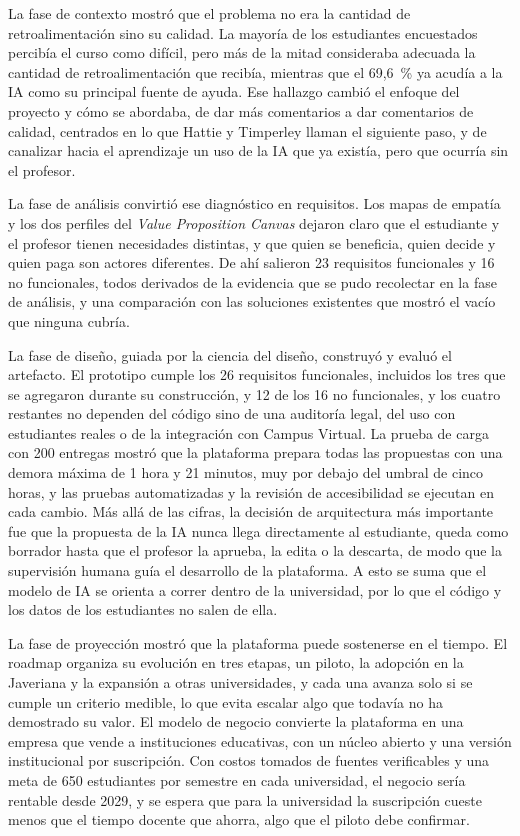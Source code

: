 \documentclass[letterpaper, 10 pt, conference]{ieeeconf}
\begin{document}
La fase de contexto mostró que el problema no era la cantidad de retroalimentación sino su calidad. La mayoría de los estudiantes encuestados percibía el curso como difícil, pero más de la mitad consideraba adecuada la cantidad de retroalimentación que recibía, mientras que el 69,6~\% ya acudía a la IA como su principal fuente de ayuda.
Ese hallazgo cambió el enfoque del proyecto y cómo se abordaba, de dar más comentarios a dar comentarios de calidad, centrados en lo que Hattie y Timperley llaman el siguiente paso, y de canalizar hacia el aprendizaje un uso de la IA que ya existía, pero que ocurría sin el profesor.

La fase de análisis convirtió ese diagnóstico en requisitos. Los mapas de empatía y los dos perfiles del \textit{Value Proposition Canvas} dejaron claro que el estudiante y el profesor tienen necesidades distintas, y que quien se beneficia, quien decide y quien paga son actores diferentes.
De ahí salieron 23 requisitos funcionales y 16 no funcionales, todos derivados de la evidencia que se pudo recolectar en la fase de análisis, y una comparación con las soluciones existentes que mostró el vacío que ninguna cubría. 

La fase de diseño, guiada por la ciencia del diseño, construyó y evaluó el artefacto. El prototipo cumple los 26 requisitos funcionales, incluidos los tres que se agregaron durante su construcción, y 12 de los 16 no funcionales, y los cuatro restantes no dependen del código sino de una auditoría legal, del uso con estudiantes reales o de la integración con Campus Virtual.
La prueba de carga con 200 entregas mostró que la plataforma prepara todas las propuestas con una demora máxima de 1 hora y 21 minutos, muy por debajo del umbral de cinco horas, y las pruebas automatizadas y la revisión de accesibilidad se ejecutan en cada cambio.
Más allá de las cifras, la decisión de arquitectura más importante fue que la propuesta de la IA nunca llega directamente al estudiante, queda como borrador hasta que el profesor la aprueba, la edita o la descarta, de modo que la supervisión humana guía el desarrollo de la plataforma.
A esto se suma que el modelo de IA se orienta a correr dentro de la universidad, por lo que el código y los datos de los estudiantes no salen de ella.

La fase de proyección mostró que la plataforma puede sostenerse en el tiempo. El roadmap organiza su evolución en tres etapas, un piloto, la adopción en la Javeriana y la expansión a otras universidades, y cada una avanza solo si se cumple un criterio medible, lo que evita escalar algo que todavía no ha demostrado su valor.
El modelo de negocio convierte la plataforma en una empresa que vende a instituciones educativas, con un núcleo abierto y una versión institucional por suscripción.
Con costos tomados de fuentes verificables y una meta de 650 estudiantes por semestre en cada universidad, el negocio sería rentable desde 2029, y se espera que para la universidad la suscripción cueste menos que el tiempo docente que ahorra, algo que el piloto debe confirmar.
\end{document}

